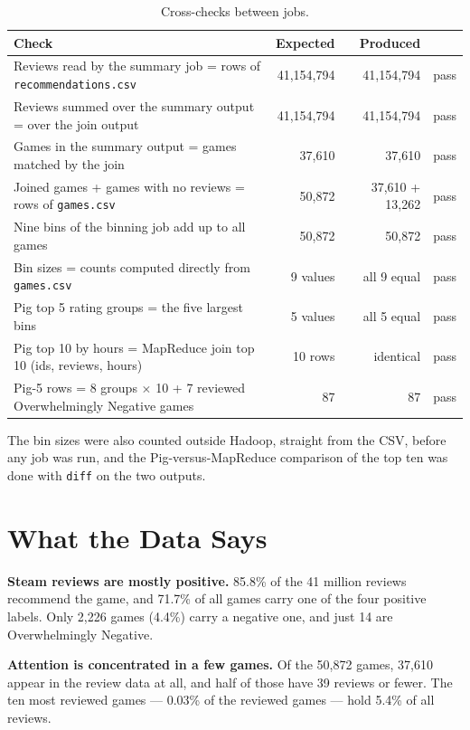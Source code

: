 \documentclass[11pt,a4paper]{article}
\newcommand{\code}[1]{\texttt{#1}}
\begin{document}
\begin{table}[H]\centering\small
\begin{tabularx}{\linewidth}{X r r c}
\toprule
Check & Expected & Produced & \\
\midrule
Reviews read by the summary job = rows of \code{recommendations.csv} & 41,154,794 & 41,154,794 & pass \\
Reviews summed over the summary output = over the join output & 41,154,794 & 41,154,794 & pass \\
Games in the summary output = games matched by the join & 37,610 & 37,610 & pass \\
Joined games + games with no reviews = rows of \code{games.csv} & 50,872 & 37,610 + 13,262 & pass \\
Nine bins of the binning job add up to all games & 50,872 & 50,872 & pass \\
Bin sizes = counts computed directly from \code{games.csv} & 9 values & all 9 equal & pass \\
Pig top 5 rating groups = the five largest bins & 5 values & all 5 equal & pass \\
Pig top 10 by hours = MapReduce join top 10 (ids, reviews, hours) & 10 rows & identical & pass \\
Pig-5 rows = 8 groups $\times$ 10 + 7 reviewed Overwhelmingly Negative games & 87 & 87 & pass \\
\bottomrule
\end{tabularx}
\caption{Cross-checks between jobs.}
\end{table}

The bin sizes were also counted outside Hadoop, straight from the CSV, before any job was run, and
the Pig-versus-MapReduce comparison of the top ten was done with \code{diff} on the two outputs.

\section{What the Data Says}

\textbf{Steam reviews are mostly positive.} 85.8\% of the 41 million reviews recommend the game, and
71.7\% of all games carry one of the four positive labels. Only 2,226 games (4.4\%) carry a negative
one, and just 14 are Overwhelmingly Negative.

\textbf{Attention is concentrated in a few games.} Of the 50,872 games, 37,610 appear in the review
data at all, and half of those have 39 reviews or fewer. The ten most reviewed games — 0.03\% of the
reviewed games — hold 5.4\% of all reviews.
\end{document}
